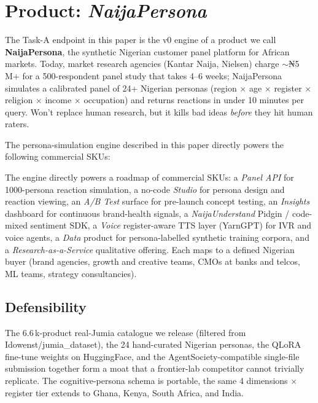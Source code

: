 \documentclass[sigconf,nonacm,balance]{acmart}
\begin{document}
\section{Product: \emph{NaijaPersona}}
\label{sec:product}

The Task-A endpoint in this paper is the v0 engine of a product we call
\textbf{NaijaPersona}, the synthetic Nigerian customer panel platform
for African markets. Today, market research agencies (Kantar Naija,
Nielsen) charge $\sim$₦5\,M+ for a 500-respondent panel study that
takes 4--6 weeks; NaijaPersona simulates a calibrated panel of 24+
Nigerian personas (region $\times$ age $\times$ register $\times$
religion $\times$ income $\times$ occupation) and returns reactions in
under 10 minutes per query. Won't replace human research, but it
kills bad ideas \emph{before} they hit human raters.

The persona-simulation engine described in this paper directly powers
the following commercial SKUs:

The engine directly powers a roadmap of commercial SKUs: a
\emph{Panel API} for 1000-persona reaction simulation, a no-code
\emph{Studio} for persona design and reaction viewing, an
\emph{A/B Test} surface for pre-launch concept testing, an
\emph{Insights} dashboard for continuous brand-health signals, a
\emph{NaijaUnderstand} Pidgin / code-mixed sentiment SDK, a
\emph{Voice} register-aware TTS layer (YarnGPT) for IVR and voice
agents, a \emph{Data} product for persona-labelled synthetic training
corpora, and a \emph{Research-as-a-Service} qualitative offering. Each
maps to a defined Nigerian buyer (brand agencies, growth and creative
teams, CMOs at banks and telcos, ML teams, strategy consultancies).

\subsection*{Defensibility}
The 6.6\,k-product real-Jumia catalogue we release (filtered from
\textsf{Idowenst/jumia\_dataset}), the 24 hand-curated Nigerian personas,
the QLoRA fine-tune weights on HuggingFace, and the AgentSociety-compatible
single-file submission together form a moat that a frontier-lab competitor
cannot trivially replicate. The cognitive-persona schema is portable,
the same 4 dimensions $\times$ register tier extends to Ghana, Kenya,
South Africa, and India.
\end{document}
